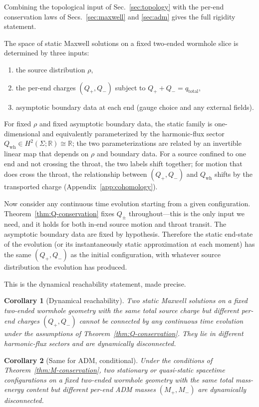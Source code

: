 \documentclass[aps,prd,onecolumn,nofootinbib,superscriptaddress]{revtex4-2}
\newtheorem{corollary}{Corollary}
\begin{document}
Combining the topological input of Sec.~\ref{sec:topology} with the per-end conservation laws of Secs.~\ref{sec:maxwell} and \ref{sec:adm} gives the full rigidity statement.

The space of static Maxwell solutions on a fixed two-ended wormhole slice is determined by three inputs:
\begin{enumerate}
    \item the source distribution $\rho$,
    \item the per-end charges $(Q_+,Q_-)$ subject to $Q_+ + Q_- = q_{\mathrm{total}}$,
    \item asymptotic boundary data at each end (gauge choice and any external fields).
\end{enumerate}
For fixed $\rho$ and fixed asymptotic boundary data, the static family is one-dimensional and equivalently parameterized by the harmonic-flux sector $Q_{\mathrm{wh}} \in H^2(\Sigma;\mathbb{R}) \cong \mathbb{R}$; the two parameterizations are related by an invertible linear map that depends on $\rho$ and boundary data. For a source confined to one end and not crossing the throat, the two labels shift together; for motion that does cross the throat, the relationship between $(Q_+,Q_-)$ and $Q_{\mathrm{wh}}$ shifts by the transported charge (Appendix~\ref{app:cohomology}).

Now consider any continuous time evolution starting from a given configuration. Theorem~\ref{thm:Q-conservation} fixes $Q_\pm$ throughout---this is the only input we need, and it holds for both in-end source motion and throat transit. The asymptotic boundary data are fixed by hypothesis. Therefore the static end-state of the evolution (or its instantaneously static approximation at each moment) has the same $(Q_+,Q_-)$ as the initial configuration, with whatever source distribution the evolution has produced.

This is the dynamical reachability statement, made precise.

\begin{corollary}[Dynamical reachability]
\label{cor:reachability}
Two static Maxwell solutions on a fixed two-ended wormhole geometry with the same total source charge but different per-end charges $(Q_+,Q_-)$ cannot be connected by any continuous time evolution under the assumptions of Theorem~\ref{thm:Q-conservation}. They lie in different harmonic-flux sectors and are dynamically disconnected.
\end{corollary}

\begin{corollary}[Same for ADM, conditional]
\label{cor:reachability-adm}
Under the conditions of Theorem~\ref{thm:M-conservation}, two stationary or quasi-static spacetime configurations on a fixed two-ended wormhole geometry with the same total mass-energy content but different per-end ADM masses $(M_+,M_-)$ are dynamically disconnected.
\end{corollary}
\end{document}
